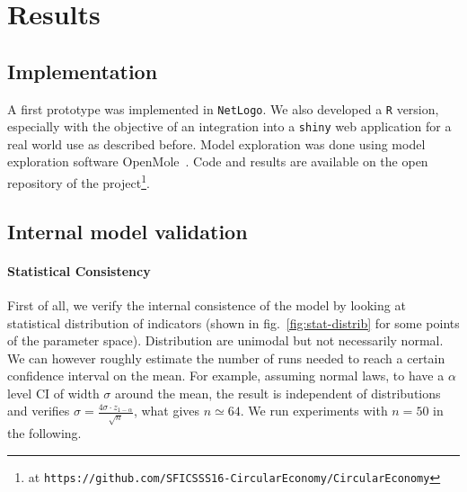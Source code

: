 \documentclass[fleqn,10pt]{wlscirep}
\begin{document}
{%











\section*{Results}






\subsection*{Implementation}

A first prototype was implemented in \texttt{NetLogo}. We also developed a \texttt{R} version, especially with the objective of an integration into a \texttt{shiny} web application for a real world use as described before. Model exploration was done using model exploration software OpenMole~\cite{reuillon2013openmole}. Code and results are available on the open repository of the project\footnote{at \texttt{https://github.com/SFICSSS16-CircularEconomy/CircularEconomy}}.




\subsection*{Internal model validation}


\paragraph*{Statistical Consistency}

First of all, we verify the internal consistence of the model by looking at statistical distribution of indicators (shown in fig.~\ref{fig:stat-distrib} for some points of the parameter space). Distribution are unimodal but not necessarily normal. We can however roughly estimate the number of runs needed to reach a certain confidence interval on the mean. For example, assuming normal laws, to have a $\alpha$ level CI of width $\sigma$ around the mean, the result is independent of distributions and verifies $\sigma = \frac{4\sigma \cdot z_{1-\alpha}}{\sqrt{n}}$, what gives $n\simeq 64$. We run experiments with $n=50$ in the following.


}
\end{document}
